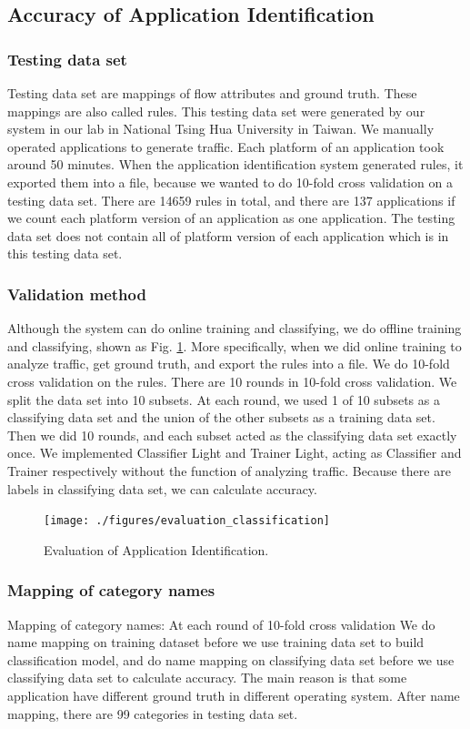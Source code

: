 \documentclass[journal]{IEEEtran}
\begin{document}
\subsection{Accuracy of Application Identification}
\subsubsection{Testing data set}
Testing data set are mappings of flow attributes and ground truth.
These mappings are also called rules.
This testing data set were generated by our system in our lab in National Tsing Hua University in Taiwan.
We manually operated applications to generate traffic.
Each platform of an application took around 50 minutes.
When the application identification system generated rules, it exported them into a file,
because we wanted to do 10-fold cross validation on a testing data set.
There are 14659 rules in total,
and there are 137 applications if we count each platform version of an application as one application.
The testing data set does not contain all of platform version of each application which is in this testing data set.

\subsubsection{Validation method}
Although the system can do online training and classifying,
we do offline training and classifying, shown as Fig. \ref{fig:evaluation_classification}.
More specifically, when we did online training to analyze traffic,
get ground truth, and export the rules into a file. We do 10-fold cross validation on the rules.
There are 10 rounds in 10-fold cross validation. We split the data set into 10 subsets.
At each round, we used 1 of 10 subsets as a classifying data set and the union of the other subsets as a training data set.
Then we did 10 rounds, and each subset acted as the classifying data set exactly once.
We implemented Classifier Light and Trainer Light, acting as Classifier and Trainer respectively without the function of analyzing traffic.
Because there are labels in classifying data set, we can calculate accuracy.

\begin{figure}[!t]
\centering
\texttt{[image: ./figures/evaluation\_classification]}
\caption{Evaluation of Application Identification.}
\label{fig:evaluation_classification}
\end{figure}

\subsubsection{Mapping of category names}
Mapping of category names: At each round of 10-fold cross validation We do name mapping on training dataset
before we use training data set to build classification model,
and do name mapping on classifying data set before we use classifying data set to calculate accuracy.
The main reason is that some application have different ground truth in different operating system.
After name mapping, there are 99 categories in testing data set.
\end{document}

